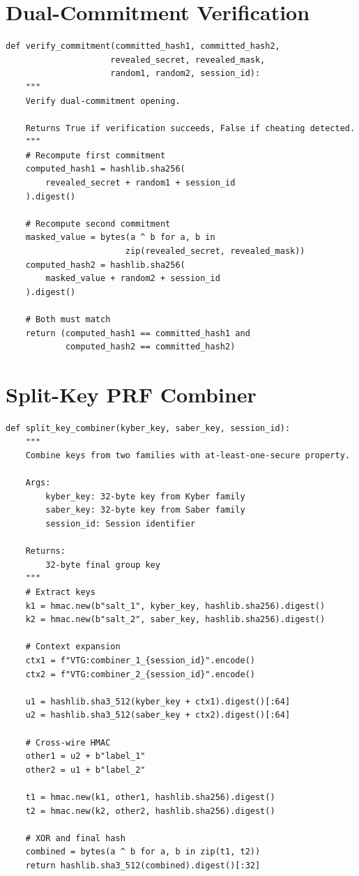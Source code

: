 \documentclass[12pt,a4paper]{report}
\begin{document}
\section{Dual-Commitment Verification}

\begin{verbatim}
def verify_commitment(committed_hash1, committed_hash2,
                     revealed_secret, revealed_mask,
                     random1, random2, session_id):
    """
    Verify dual-commitment opening.
    
    Returns True if verification succeeds, False if cheating detected.
    """
    # Recompute first commitment
    computed_hash1 = hashlib.sha256(
        revealed_secret + random1 + session_id
    ).digest()
    
    # Recompute second commitment
    masked_value = bytes(a ^ b for a, b in 
                        zip(revealed_secret, revealed_mask))
    computed_hash2 = hashlib.sha256(
        masked_value + random2 + session_id
    ).digest()
    
    # Both must match
    return (computed_hash1 == committed_hash1 and 
            computed_hash2 == committed_hash2)
\end{verbatim}

\section{Split-Key PRF Combiner}

\begin{verbatim}
def split_key_combiner(kyber_key, saber_key, session_id):
    """
    Combine keys from two families with at-least-one-secure property.
    
    Args:
        kyber_key: 32-byte key from Kyber family
        saber_key: 32-byte key from Saber family
        session_id: Session identifier
    
    Returns:
        32-byte final group key
    """
    # Extract keys
    k1 = hmac.new(b"salt_1", kyber_key, hashlib.sha256).digest()
    k2 = hmac.new(b"salt_2", saber_key, hashlib.sha256).digest()
    
    # Context expansion
    ctx1 = f"VTG:combiner_1_{session_id}".encode()
    ctx2 = f"VTG:combiner_2_{session_id}".encode()
    
    u1 = hashlib.sha3_512(kyber_key + ctx1).digest()[:64]
    u2 = hashlib.sha3_512(saber_key + ctx2).digest()[:64]
    
    # Cross-wire HMAC
    other1 = u2 + b"label_1"
    other2 = u1 + b"label_2"
    
    t1 = hmac.new(k1, other1, hashlib.sha256).digest()
    t2 = hmac.new(k2, other2, hashlib.sha256).digest()
    
    # XOR and final hash
    combined = bytes(a ^ b for a, b in zip(t1, t2))
    return hashlib.sha3_512(combined).digest()[:32]
\end{verbatim}
\end{document}
